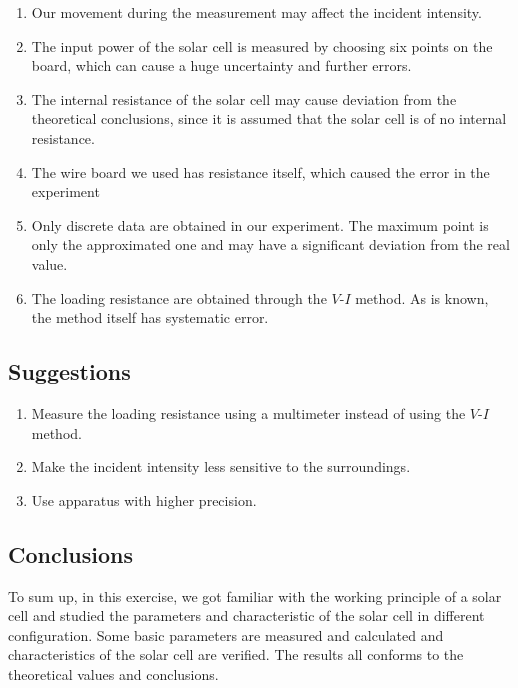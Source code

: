 \documentclass{article}
\begin{document}
{\begin{enumerate}
    \item Our movement during the measurement may affect the incident intensity.
    \item The input power of the solar cell is measured by choosing six points on the board, which can cause a huge uncertainty and further errors.
    \item The internal resistance of the solar cell may cause deviation from the theoretical conclusions, since it is assumed that the solar cell is of no internal resistance.
    \item The wire board we used has resistance itself, which caused the error in the experiment
    \item Only discrete data are obtained in our experiment. The maximum point is only the approximated one and may have a significant deviation from the real value.
    \item The loading resistance are obtained through the $V$-$I$ method. As is known, the method itself has systematic error.
\end{enumerate}

\subsection{Suggestions}

\begin{enumerate}
    \item Measure the loading resistance using a multimeter instead of using the $V$-$I$ method.
    \item Make the incident intensity less sensitive to the surroundings.
    \item Use apparatus with higher precision.
\end{enumerate}

\subsection{Conclusions}

To sum up, in this exercise, we got familiar with the working principle of a solar cell and studied the parameters and characteristic of the solar cell in different configuration. Some basic parameters are measured and calculated and characteristics of the solar cell are verified. The results all conforms to the theoretical values and conclusions.

\begin{thebibliography}{1}


\end{thebibliography}}
\end{document}
